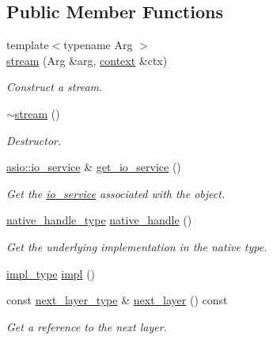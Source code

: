 \subsection*{Public Member Functions}
\begin{DoxyCompactItemize}
\item 
{\footnotesize template$<$typename Arg $>$ }\\\hyperlink{classasio_1_1ssl_1_1stream_a242eca3fa8fdd5926fb8eafdab0b46fa}{stream} (Arg \&arg, \hyperlink{classasio_1_1ssl_1_1context}{context} \&ctx)
\begin{DoxyCompactList}\small\item\em Construct a stream. \end{DoxyCompactList}\item 
\hyperlink{classasio_1_1ssl_1_1stream_a51cbc4691960a13f26b19fb7dec1e195}{$\sim$stream} ()
\begin{DoxyCompactList}\small\item\em Destructor. \end{DoxyCompactList}\item 
\hyperlink{classasio_1_1io__service}{asio\+::io\+\_\+service} \& \hyperlink{classasio_1_1ssl_1_1stream_a27e17e1f275a2d465a177f81bb09f026}{get\+\_\+io\+\_\+service} ()
\begin{DoxyCompactList}\small\item\em Get the \hyperlink{classasio_1_1io__service}{io\+\_\+service} associated with the object. \end{DoxyCompactList}\item 
\hyperlink{classasio_1_1ssl_1_1stream_ad10bd7f631ed0704388d4dd90b5f3342}{native\+\_\+handle\+\_\+type} \hyperlink{classasio_1_1ssl_1_1stream_a08506517747d6f5b2174f0f35dd49fa9}{native\+\_\+handle} ()
\begin{DoxyCompactList}\small\item\em Get the underlying implementation in the native type. \end{DoxyCompactList}\item 
\hyperlink{classasio_1_1ssl_1_1stream_ab97c7dbb5b2ffcf9ee0e63ddc8481ab7}{impl\+\_\+type} \hyperlink{classasio_1_1ssl_1_1stream_a83a42c3b621a772142ab1d25b1f6d811}{impl} ()
\item 
const \hyperlink{classasio_1_1ssl_1_1stream_ae0c066ed414d0d7898b9d2e7998ef98e}{next\+\_\+layer\+\_\+type} \& \hyperlink{classasio_1_1ssl_1_1stream_ad6b134dd83fc1dfcc287a6aca71680ea}{next\+\_\+layer} () const 
\begin{DoxyCompactList}\small\item\em Get a reference to the next layer. \end{DoxyCompactList}\item 

\end{DoxyCompactItemize}
